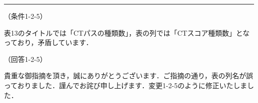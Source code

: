 \documentclass{jarticle} %
\def\subsection#1{ \vspace{1pc} {\gt #1} }
\def\nextans{ \vspace{2pc} \hrule }
\begin{document}
\newpage
\nextans
\subsection{（条件1-2-5）}

表13のタイトルでは「CTパスの種類数」，表の列では「CTスコア種類数」となっており，矛盾しています．

\subsection{（回答1-2-5）}

貴重な御指摘を頂き，誠にありがとうございます．ご指摘の通り，表の列名が誤っておりました．謹んでお詫び申し上げます．変更1-2-5のように修正いたしました．


\renewcommand{\thetable}{\arabic{table}}
\setcounter{table}{12}
\end{document}
